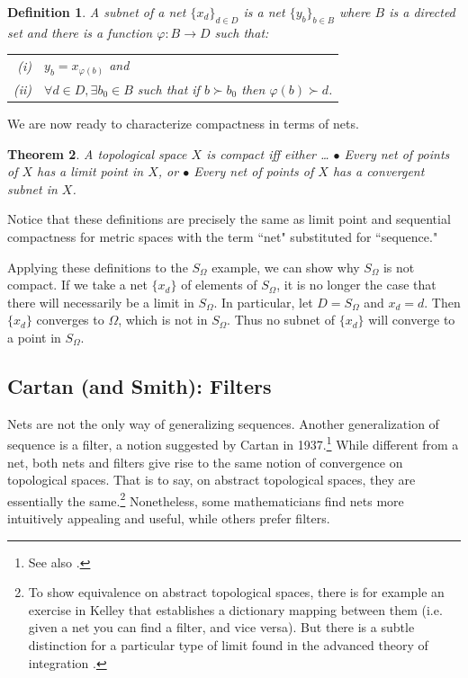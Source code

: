 \documentclass[12pt]{article}
\newtheorem{thm}{Theorem}[section]
\newtheorem{dfn}[thm]{Definition}
\begin{document}
\begin{dfn}
A {\em subnet} of a net $\{x_d\}_{d \in D}$  is a net $\{y_b\}_{b \in B}$  where $B$
is a directed set and there is a function $\varphi:B \rightarrow D$  such that:\\
\begin{tabular}{r@{  }l}
 (i) & $y_b = x_{\varphi(b)}$      and \\
 (ii) & $\forall  d \in D, \exists b_0 \in B$ such that if $b \succ b_0$ then
$\varphi(b) \succ d$. \\
\end{tabular}
\end{dfn}

We are now ready to characterize compactness in terms of nets.

\begin{thm}
A topological space $X$  is {\em compact} iff either \ldots
\newline $\bullet$  Every net of points of $X$  has a limit point in  $X$, or
\newline $\bullet$ Every net of points of $X$  has a convergent subnet in $X$.

\end{thm}

Notice that these definitions are precisely the same as limit point and sequential
 compactness for metric spaces with the term ``net" substituted for ``sequence."

Applying these definitions to the $S_\Omega$  example, we can show why $S_\Omega$ is
not compact.
  If we take a net ${\{x_d\}}$ of elements of  $S_\Omega$, it is no longer the case that
there will necessarily be a limit in $S_\Omega$. In particular, let $D = S_\Omega$ 
and 
$x_d = d$. Then ${\{x_d\}}$  converges to $\Omega$, which is not in $S_\Omega$. Thus no
subnet of ${\{x_d\}}$ will converge to a point in $S_\Omega$. 

\subsection{Cartan (and Smith): Filters}

Nets are not the only way of generalizing sequences. Another generalization of
sequence is a filter, a notion suggested by Cartan in 1937.\footnote{See also \cite[p. 8]{bou2}.} While different from a net, both nets
and filters give rise to the same notion of convergence on topological spaces. That is to say, on 
abstract topological spaces, they are essentially the same.\footnote{To show equivalence on abstract topological spaces, there is for example an exercise in Kelley that establishes a 
dictionary mapping between them (i.e. given a net you can find a filter, and vice
versa)\cite[p. 83]{kell}. But there is a subtle distinction for a particular type of
limit found in the advanced theory of integration \cite[p. 371]{smit}.} Nonetheless, some mathematicians find nets more intuitively appealing and useful, while others prefer filters.
\end{document}
